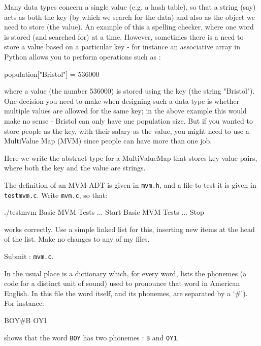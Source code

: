 




Many data types concern a single value (e.g. a hash table), so that
a string (say) acts as both the key (by which we search for the data)
and also as the object we need to store (the value). An example of this a spelling checker,
where one word is stored (and searched for) at a time.  However, sometimes
there is a need to store a value based on a particular key - for instance
an associative array in Python allows you to perform operations such as :
\begin{codesnippet} 
population["Bristol"] = 536000
\end{codesnippet} 
where a value (the number 536000) is stored using the key (the string "Bristol").
One decision you need to make when designing such a data type is whether
multiple values are allowed for the same key; in the above example this
would make no sense - Bristol can only have one population size. But if
you wanted to store people as the key, with their salary as the value,
you might need to use a MultiValue Map (MVM) since people can have more than
one job.

Here we write the abstract type for a MultiValueMap that stores key-value pairs,
where both the key and the value are strings.

\begin{exercise}
\label{ex:mvm}
The definition of an MVM ADT is given in \verb^mvm.h^, and a file to test it is given
in \verb^testmvm.c^.  Write \verb^mvm.c^, so that:
{\small
\begin{terminaloutput}
./testmvm
Basic MVM Tests ... Start
Basic MVM Tests ... Stop
\end{terminaloutput}
}
\noindent works correctly. Use a simple linked list for this, inserting
new items at the head of the list.
Make no changes to any of my files.

Submit : \verb^mvm.c^.
\end{exercise}


In the usual place is a dictionary which, for every word, lists the
phonemes (a code for a distinct unit of sound) used to pronounce that word
in American English. In this file the word itself, and its phonemes,
are separated by a `\#').  For instance:
\begin{codesnippet}
BOY#B OY1
\end{codesnippet}
shows that the word \verb^BOY^ has two phonemes : \verb^B^ and \verb^OY1^.

